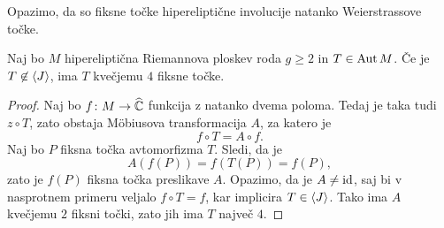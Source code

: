 
Opazimo, da so fiksne točke hipereliptične involucije natanko
Weierstrassove točke.

\begin{trditev}
Naj bo $M$ hipereliptična Riemannova ploskev roda $g \geq 2$ in
$T \in \operatorname{Aut} M$. Če je $T \not \in \left\langle J\right\rangle$, ima $T$ kvečjemu $4$
fiksne točke.
\end{trditev}

\begin{proof}
Naj bo $f \colon M \to \widehat{\mathbb{C}}$ funkcija z natanko dvema poloma. Tedaj
je taka tudi $z \circ T$, zato obstaja Möbiusova transformacija
$A$, za katero je
\[
f \circ T = A \circ f.
\]
Naj bo $P$ fiksna točka avtomorfizma $T$. Sledi, da je
\[
A(f(P)) = f(T(P)) = f(P),
\]
zato je $f(P)$ fiksna točka preslikave $A$. Opazimo, da je
$A \ne \operatorname{id}$, saj bi v nasprotnem primeru veljalo $f \circ T = f$,
kar implicira $T \in \left\langle J\right\rangle$. Tako ima $A$ kvečjemu $2$ fiksni
točki, zato jih ima $T$ največ $4$.
\end{proof}

